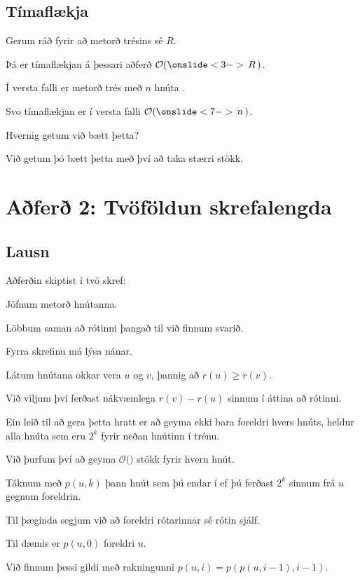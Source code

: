 \subsection{Tímaflækja}
{
    {
        \item<1-> Gerum ráð fyrir að metorð trésins sé $R$.
        \item<2-> Þá er tímaflækjan á þessari aðferð $\mathcal{O}(\onslide<3->{\,R\,})$.
        \item<4-> Í versta falli er metorð trés með $n$ hnúta .
        \item<6-> Svo tímaflækjan er í versta falli $\mathcal{O}(\onslide<7->{\,n\,})$.
        \item<8-> Hvernig getum við bætt þetta?
        \item<9-> Við getum þó bætt þetta með því að taka stærri stökk.
    }
}

\section{Aðferð 2: Tvöföldun skrefalengda}
\subsection{Lausn}
{
    {
        \item<1-> Aðferðin skiptist í tvö skref:
        {
            \item<2-> Jöfnum metorð hnútanna.
            \item<3-> Löbbum saman að rótinni þangað til við finnum svarið.
        }
        \item<4-> Fyrra skrefinu má lýsa nánar.
        \item<5-> Látum hnútana okkar vera $u$ og $v$, þannig að $r(u) \geq r(v)$.
        \item<6-> Við viljum því ferðast nákvæmlega $r(v) - r(u)$ sinnum í áttina að rótinni.
        \item<7-> Ein leið til að gera þetta hratt er að geyma ekki bara foreldri hvers hnúts,
                    heldur alla hnúta sem eru $2^k$ fyrir neðan hnútinn í trénu.
        \item<8-> Við þurfum því að geyma $\mathcal{O}($$)$ stökk fyrir hvern hnút.
        \item<10-> Táknum með $p(u, k)$ þann hnút sem þú endar í ef þú ferðast $2^k$ sinnum frá $u$ gegnum foreldrin.
        \item<11-> Til þæginda segjum við að foreldri rótarinnar sé rótin sjálf.
        \item<12-> Til dæmis er $p(u, 0)$ foreldri $u$.
        \item<13-> Við finnum þessi gildi með rakningunni $p(u, i) = p(p(u, i - 1), i - 1)$.
    }
}

